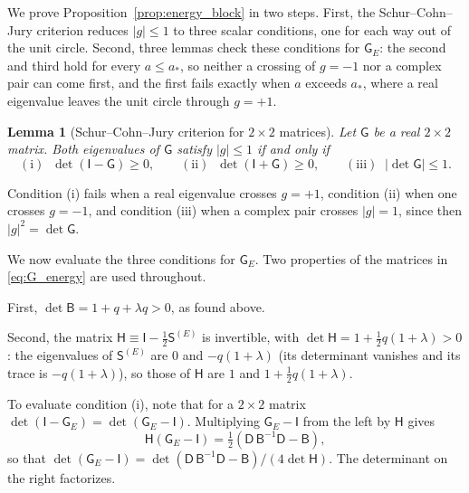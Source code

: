 \documentclass[preprint,12pt,authoryear]{elsarticle}
\newcommand{\tenS}{\mathsf{S}}
\newcommand{\tenI}{\mathsf{I}}
\newcommand{\tenG}{\mathsf{G}}
\providecommand{\tenD}{\mathsf{D}}
\providecommand{\tenB}{\mathsf{B}}
\newtheorem{lem}{Lemma}
\providecommand{\tenH}{\mathsf{H}}
\begin{document}
\begin{appendix}
We prove Proposition~\ref{prop:energy_block} in two steps. First, the Schur--Cohn--Jury criterion \citep{Jury64a} reduces $|g| \leq 1$ to three scalar conditions, one for each way out of the unit circle. Second, three lemmas check these conditions for $\tenG_E$: the second and third hold for every $a \leq a_*$, so neither a crossing of $g = -1$ nor a complex pair can come first, and the first fails exactly when $a$ exceeds $a_*$, where a real eigenvalue leaves the unit circle through $g = +1$.

\begin{lem}[Schur--Cohn--Jury criterion for $2\times2$ matrices]
\label{lem:jury}
Let $\tenG$ be a real $2 \times 2$ matrix. Both eigenvalues of $\tenG$ satisfy $|g| \leq 1$ if and only if
\begin{equation}
    \mathrm{(i)}\;\; \det\left(\tenI - \tenG\right) \geq 0,
    \qquad
    \mathrm{(ii)}\;\; \det\left(\tenI + \tenG\right) \geq 0,
    \qquad
    \mathrm{(iii)}\;\; \left|\det\tenG\right| \leq 1 .
    \label{eq:jury}
\end{equation}
\end{lem}

Condition (i) fails when a real eigenvalue crosses $g = +1$, condition (ii) when one crosses $g = -1$, and condition (iii) when a complex pair crosses $|g| = 1$, since then $|g|^2 = \det\tenG$.

We now evaluate the three conditions for $\tenG_E$. Two properties of the matrices in \autoref{eq:G_energy} are used throughout.

First, $\det\tenB = 1 + q + \lambda q > 0$, as found above.

Second, the matrix $\tenH \equiv \tenI - \tfrac{1}{2}\tenS^{(E)}$ is invertible, with $\det\tenH = 1 + \tfrac{1}{2}q(1 + \lambda) > 0$: the eigenvalues of $\tenS^{(E)}$ are $0$ and $-q(1 + \lambda)$ (its determinant vanishes and its trace is $-q(1 + \lambda)$), so those of $\tenH$ are $1$ and $1 + \tfrac{1}{2}q(1 + \lambda)$.

To evaluate condition (i), note that for a $2\times2$ matrix $\det(\tenI - \tenG_E) = \det(\tenG_E - \tenI)$. Multiplying $\tenG_E - \tenI$ from the left by $\tenH$ gives
\begin{equation}
    \tenH\left(\tenG_E - \tenI\right) = \tfrac{1}{2}\left(\tenD\,\tenB^{-1}\tenD - \tenB\right),
    \label{eq:GminusI}
\end{equation}
so that $\det(\tenG_E - \tenI) = \det(\tenD\,\tenB^{-1}\tenD - \tenB)/(4\det\tenH)$. The determinant on the right factorizes.


\end{appendix}
\end{document}
